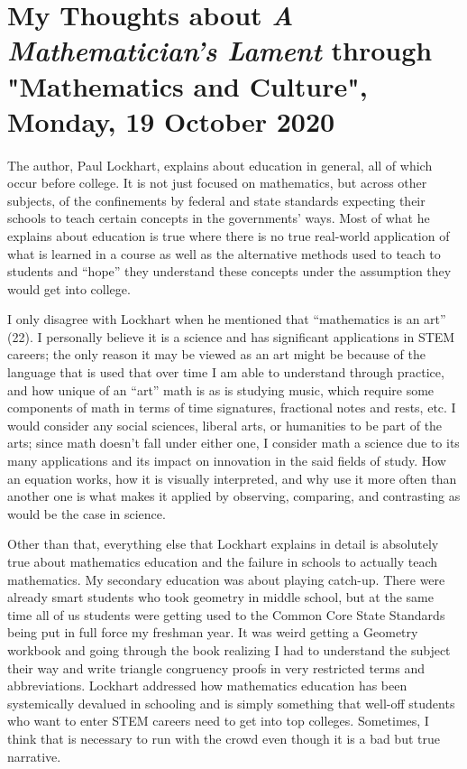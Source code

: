\documentclass{article}
\begin{document}
\section{My Thoughts about \emph{A Mathematician's Lament} through "Mathematics and Culture", Monday, 19 October 2020}

\paragraph{}The author, Paul Lockhart, explains about education in general, all of which occur before college. It is not just focused on mathematics, but across other subjects, of the confinements by federal and state standards expecting their schools to teach certain concepts in the governments’ ways. Most of what he explains about education is true where there is no true real-world application of what is learned in a course as well as the alternative methods used to teach to students and “hope” they understand these concepts under the assumption they would get into college. 

I only disagree with Lockhart when he mentioned that “mathematics is an art” (22). I personally believe it is a science and has significant applications in STEM careers; the only reason it may be viewed as an art might be because of the language that is used that over time I am able to understand through practice, and how unique of an “art” math is as is studying music, which require some components of math in terms of time signatures, fractional notes and rests, etc. I would consider any social sciences, liberal arts, or humanities to be part of the arts; since math doesn’t fall under either one, I consider math a science due to its many applications and its impact on innovation in the said fields of study. How an equation works, how it is visually interpreted, and why use it more often than another one is what makes it applied by observing, comparing, and contrasting as would be the case in science. 

Other than that, everything else that Lockhart explains in detail is absolutely true about mathematics education and the failure in schools to actually teach mathematics. My secondary education was about playing catch-up. There were already smart students who took geometry in middle school, but at the same time all of us students were getting used to the Common Core State Standards being put in full force my freshman year. It was weird getting a Geometry workbook and going through the book realizing I had to understand the subject their way and write triangle congruency proofs in very restricted terms and abbreviations. Lockhart addressed how mathematics education has been systemically devalued in schooling and is simply something that well-off students who want to enter STEM careers need to get into top colleges. Sometimes, I think that is necessary to run with the crowd even though it is a bad but true narrative. 
\end{document}
